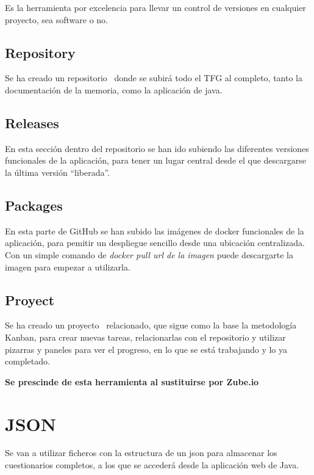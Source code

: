 Es la herramienta por excelencia para llevar un control de versiones en cualquier proyecto, sea software o no.

\subsection{Repository}

Se ha creado un repositorio~\cite{github:repo} donde se subirá todo el TFG al completo, tanto la documentación de la memoria, como la aplicación de java.

\subsection{Releases}

En esta sección dentro del repositorio se han ido subiendo las diferentes versiones funcionales de la aplicación, para tener un lugar central desde el que descargarse la última versión ``liberada''.

\subsection{Packages}

En esta parte de GitHub se han subido las imágenes de docker funcionales de la aplicación, para pemitir un despliegue sencillo desde una ubicación centralizada.
Con un simple comando de \textit{docker pull url de la imagen} puede descargarte la imagen para empezar a utilizarla.

\subsection{Proyect}

Se ha creado un proyecto~\cite{github:proyect} relacionado, que sigue como la base la metodología Kanban, para crear nuevas tareas, relacionarlas con el repositorio y utilizar pizarras y paneles para ver el progreso, en lo que se está trabajando y lo ya completado.

\textbf{Se prescinde de esta herramienta al sustituirse por Zube.io}

\section{JSON}

Se van a utilizar ficheros con la estructura de un json para almacenar los cuestionarios completos, a los que se accederá desde la aplicación web de Java.

